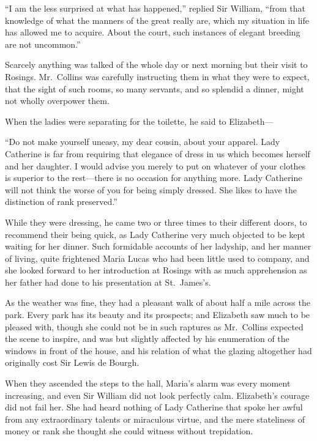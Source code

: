 \documentclass[12pt,english,oneside]{book}
\begin{document}
{}``I am the less surprised at what has happened,'' replied Sir
William, {}``from that knowledge of what the manners of the great
really are, which my situation in life has allowed me to acquire.
About the court, such instances of elegant breeding are not uncommon.''

Scarcely anything was talked of the whole day or next morning but
their visit to Rosings. Mr.\ Collins was carefully instructing them
in what they were to expect, that the sight of such rooms, so many
servants, and so splendid a dinner, might not wholly overpower them.

When the ladies were separating for the toilette, he said to Elizabeth\mbox{---}

{}``Do not make yourself uneasy, my dear cousin, about your apparel.
Lady Catherine is far from requiring that elegance of dress in us
which becomes herself and her daughter. I would advise you merely
to put on whatever of your clothes is superior to the rest\mbox{---}there
is no occasion for anything more. Lady Catherine will not think the
worse of you for being simply dressed. She likes to have the distinction
of rank preserved.''

While they were dressing, he came two or three times to their different
doors, to recommend their being quick, as Lady Catherine very much
objected to be kept waiting for her dinner. Such formidable accounts
of her ladyship, and her manner of living, quite frightened Maria
Lucas who had been little used to company, and she looked forward
to her introduction at Rosings with as much apprehension as her father
had done to his presentation at St.\ James's.

As the weather was fine, they had a pleasant walk of about half a
mile across the park. Every park has its beauty and its prospects;
and Elizabeth saw much to be pleased with, though she could not be
in such raptures as Mr.\ Collins expected the scene to inspire, and
was but slightly affected by his enumeration of the windows in front
of the house, and his relation of what the glazing altogether had
originally cost Sir Lewis de Bourgh.

When they ascended the steps to the hall, Maria's alarm was every
moment increasing, and even Sir William did not look perfectly calm.
Elizabeth's courage did not fail her. She had heard nothing of Lady
Catherine that spoke her awful from any extraordinary talents or miraculous
virtue, and the mere stateliness of money or rank she thought she
could witness without trepidation.
\end{document}
